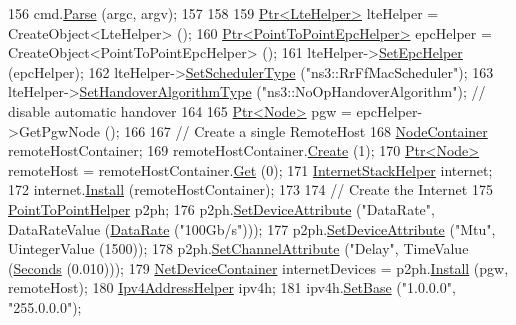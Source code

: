 \begin{DoxyCode}
156   cmd.\hyperlink{classns3_1_1CommandLine_a5c10b85b3207e5ecb48d907966923156}{Parse} (argc, argv);
157 
158 
159   \hyperlink{classns3_1_1Ptr}{Ptr<LteHelper>} lteHelper = CreateObject<LteHelper> ();
160   \hyperlink{classns3_1_1Ptr}{Ptr<PointToPointEpcHelper>} epcHelper = CreateObject<PointToPointEpcHelper> ();
161   lteHelper->\hyperlink{classns3_1_1LteHelper_a324079a1ccd54ce949786b83d6b95915}{SetEpcHelper} (epcHelper);
162   lteHelper->\hyperlink{classns3_1_1LteHelper_a8f86e55b8b80a81732c4b2df00fb25d5}{SetSchedulerType} (\textcolor{stringliteral}{"ns3::RrFfMacScheduler"});
163   lteHelper->\hyperlink{classns3_1_1LteHelper_a6301630b8a7082043efff2a7aaaa1d20}{SetHandoverAlgorithmType} (\textcolor{stringliteral}{"ns3::NoOpHandoverAlgorithm"}); \textcolor{comment}{// disable
       automatic handover}
164 
165   \hyperlink{classns3_1_1Ptr}{Ptr<Node>} pgw = epcHelper->GetPgwNode ();
166 
167   \textcolor{comment}{// Create a single RemoteHost}
168   \hyperlink{classns3_1_1NodeContainer}{NodeContainer} remoteHostContainer;
169   remoteHostContainer.\hyperlink{classns3_1_1NodeContainer_a787f059e2813e8b951cc6914d11dfe69}{Create} (1);
170   \hyperlink{classns3_1_1Ptr}{Ptr<Node>} remoteHost = remoteHostContainer.\hyperlink{classns3_1_1NodeContainer_a9ed96e2ecc22e0f5a3d4842eb9bf90bf}{Get} (0);
171   \hyperlink{classns3_1_1InternetStackHelper}{InternetStackHelper} internet;
172   internet.\hyperlink{classns3_1_1InternetStackHelper_a6645b412f31283d2d9bc3d8a95cebbc0}{Install} (remoteHostContainer);
173 
174   \textcolor{comment}{// Create the Internet}
175   \hyperlink{classns3_1_1PointToPointHelper}{PointToPointHelper} p2ph;
176   p2ph.\hyperlink{classns3_1_1PointToPointHelper_a4577f5ab8c387e5528af2e0fbab1152e}{SetDeviceAttribute} (\textcolor{stringliteral}{"DataRate"}, DataRateValue (\hyperlink{classns3_1_1DataRate}{DataRate} (\textcolor{stringliteral}{"100Gb/s"})));
177   p2ph.\hyperlink{classns3_1_1PointToPointHelper_a4577f5ab8c387e5528af2e0fbab1152e}{SetDeviceAttribute} (\textcolor{stringliteral}{"Mtu"}, UintegerValue (1500));
178   p2ph.\hyperlink{classns3_1_1PointToPointHelper_a6b5317fd17fb61e5a53f8d66a90b63b9}{SetChannelAttribute} (\textcolor{stringliteral}{"Delay"}, TimeValue (\hyperlink{group__timecivil_ga33c34b816f8ff6628e33d5c8e9713b9e}{Seconds} (0.010)));
179   \hyperlink{classns3_1_1NetDeviceContainer}{NetDeviceContainer} internetDevices = p2ph.\hyperlink{classns3_1_1PointToPointHelper_ab9162fea3e88722666fed1106df1f9ec}{Install} (pgw, remoteHost);
180   \hyperlink{classns3_1_1Ipv4AddressHelper}{Ipv4AddressHelper} ipv4h;
181   ipv4h.\hyperlink{classns3_1_1Ipv4AddressHelper_acf7b16dd25bac67e00f5e25f90a9a035}{SetBase} (\textcolor{stringliteral}{"1.0.0.0"}, \textcolor{stringliteral}{"255.0.0.0"});

\end{DoxyCode}
